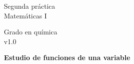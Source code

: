 \documentclass{article}
\title{\tit}
\author{}
\date{}
\def\tit{Estudio de funciones de una variable}
\begin{document}
\noindent\begin{minipage}{.4\textwidth}
\large
Segunda práctica\\
Matemáticas I
\end{minipage}
\hfill
\begin{minipage}{.4\textwidth}
\large
\flushright
Grado en química\\
v1.0
\end{minipage}

\bigskip

\begin{center}
\textbf{
\huge
\tit
}
\end{center}







\end{document}
